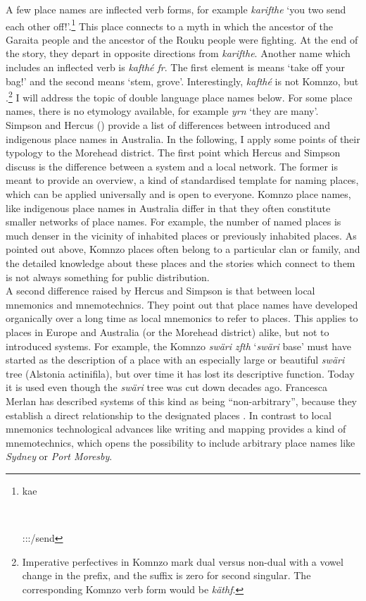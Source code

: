 A few place names are inflected verb forms, for example \emph{karifthe} `you two send each other off!'.\footnote{\parbox{0.02cm}{\hfill}\parbox{6cm}{kae}\\ \parbox{0.1cm}{\hfill}\parbox{6.06cm}{\Stdu:\Sbj:\Imp:\Pfv/send}} This place connects to a myth in which the ancestor of the Garaita people and the ancestor of the Rouku people were fighting. At the end of the story, they depart in opposite directions from \emph{karifthe}. Another name which includes an inflected verb is \emph{kafthé fr}. The first element is means `take off your bag!' and the second means `stem, grove'. Interestingly, \emph{kafthé} is not Komnzo, but .\footnote{Imperative perfectives in Komnzo mark dual versus non-dual with a vowel change in the prefix, and the suffix is zero for second singular. The corresponding Komnzo verb form would be \emph{käthf}.} I will address the topic of double language place names below. For some place names, there is no etymology available, for example \emph{yrn} `they are many'.\\

Simpson and Hercus (\citeyear{Hercus:2002ul}) provide a list of differences between introduced and indigenous place names in Australia. In the following, I apply some points of their typology to the Morehead district. The first point which Hercus and Simpson discuss is the difference between a system and a local network. The former is meant to provide an overview, a kind of standardised template for naming places, which can be applied universally and is open to everyone. Komnzo place names, like indigenous place names in Australia differ in that they often constitute smaller networks of place names. For example, the number of named places is much denser in the vicinity of inhabited places or previously inhabited places. As pointed out above, Komnzo places often belong to a particular clan or family, and the detailed knowledge about these places and the stories which connect to them is not always something for public distribution.\\

A second difference raised by Hercus and Simpson is that between local mnemonics and mnemotechnics. They point out that place names have developed organically over a long time as local mnemonics to refer to places. This applies to places in Europe and Australia (or the Morehead district) alike, but not to introduced  systems. For example, the Komnzo  \emph{swäri zfth} `\emph{swäri} base' must have started as the description of a place with an especially large or beautiful \emph{swäri} tree (Alstonia actinifila), but over time it has lost its descriptive function. Today it is used even though the \emph{swäri} tree was cut down decades ago. Francesca Merlan has described  systems of this kind as being ``non-arbitrary'', because they establish a direct relationship to the designated places \citep{Merlan:2001wp}. In contrast to local mnemonics technological advances like writing and mapping provides a kind of mnemotechnics, which opens the possibility to include arbitrary place names like \emph{Sydney} or \emph{Port Moresby}.\\

